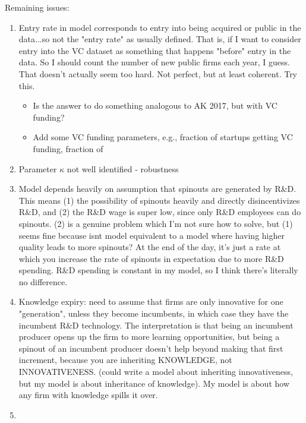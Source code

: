 \documentclass[12pt,english]{article}
\theoremstyle{remark}
\begin{document}
Remaining issues:
\begin{enumerate}
	\item Entry rate in model corresponds to entry into being acquired or public in the data...so not the "entry rate" as usually defined. That is, if I want to consider entry into the VC dataset as something that happens "before" entry in the data. So I should count the number of new public firms each year, I guess. That doesn't actually seem too hard. Not perfect, but at least coherent. Try this. 
	\begin{itemize}
		\item Is the answer to do something analogous to AK 2017, but with VC funding?
		\item Add some VC funding parameters, e.g., fraction of startups getting VC funding, fraction of 
	\end{itemize}
	\item Parameter $\kappa$ not well identified - robustness
	\item Model depends heavily on assumption that spinouts are generated by R\&D. This means (1) the possibility of spinouts heavily and directly disincentivizes R\&D, and (2) the R\&D wage is super low, since only R\&D employees can do spinouts. (2) is a genuine problem which I'm not sure how to solve, but (1) seems fine because isnt model equivalent to a model where having higher quality leads to more spinouts? At the end of the day, it's just a rate at which you increase the rate of spinouts in expectation due to more R\&D spending. R\&D spending is constant in my model, so I think there's literally no difference.
	\item Knowledge expiry: need to assume that firms are only innovative for one "generation", unless they become incumbents, in which case they have the incumbent R\&D technology. The interpretation is that being an incumbent producer opens up the firm to more learning opportunities, but being a spinout of an incumbent producer doesn't help beyond making that first increment, because you are inheriting KNOWLEDGE, not INNOVATIVENESS. (could write a model about inheriting innovativeness, but my model is about inheritance of knowledge). My model is about how any firm with knowledge spills it over. 
	\item 
\end{enumerate}
\end{document}

